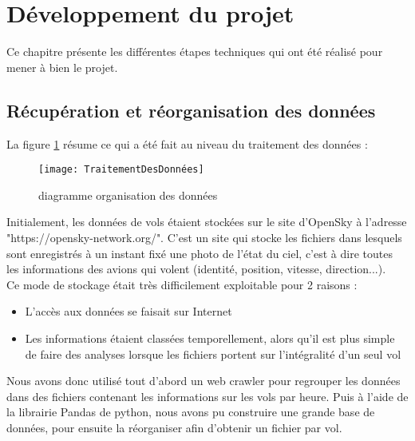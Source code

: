 \chapter*{Développement du projet}
\label{sec:developpement}

Ce chapitre présente les différentes étapes techniques qui ont été réalisé pour mener à bien le projet. 

\section*{Récupération et réorganisation des données}

La figure \ref{fig:traitement_donnees} résume ce qui a été fait au niveau du traitement des données : 

\begin{figure}[!h]
	\centering
	\texttt{[image: TraitementDesDonnées]}
	\caption{diagramme organisation des données}
	\label{fig:traitement_donnees}
\end{figure}


Initialement, les données de vols étaient stockées sur le site d'OpenSky à l'adresse "https://opensky-network.org/". C'est un site qui stocke les fichiers dans lesquels sont enregistrés à un instant fixé une photo de l'état du ciel, c'est à dire toutes les informations des avions qui volent (identité, position, vitesse, direction...).\\

Ce mode de stockage était très difficilement exploitable pour 2 raisons : 

\begin{itemize}
	\item L'accès aux données se faisait sur Internet
	\item Les informations étaient classées temporellement, alors qu'il est plus simple de faire des analyses lorsque les fichiers portent sur l'intégralité d'un seul vol 
\end{itemize}

Nous avons donc utilisé tout d'abord un web crawler pour regrouper les données dans des fichiers contenant les informations sur les vols par heure. Puis à l'aide de la librairie Pandas de python, nous avons pu construire une grande base de données, pour ensuite la réorganiser afin d'obtenir un fichier par vol. \\


